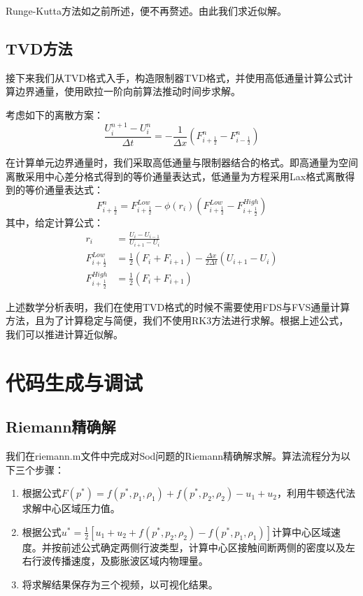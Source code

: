 \documentclass[12pt,a4paper]{article}%
\begin{document}
		Runge-Kutta方法如之前所述，便不再赘述。由此我们求近似解。
		
		\subsection{TVD方法}
		接下来我们从TVD格式入手，构造限制器TVD格式，并使用高低通量计算公式计算边界通量，使用欧拉一阶向前算法推动时间步求解。
		
		考虑如下的离散方案：
		\[
			\frac{U_i^{n+1} - U_i^n}{\Delta t} = -\frac{1}{\Delta x}(F^n_{i+\frac12} - F^n_{i-\frac12})
		\]
		
		在计算单元边界通量时，我们采取高低通量与限制器结合的格式。即高通量为空间离散采用中心差分格式得到的等价通量表达式，低通量为方程采用Lax格式离散得到的等价通量表达式：
		\[
			F^n_{i+\frac12} = F^{Low}_{i+\frac12} - \phi(r_i)(F^{Low}_{i+\frac12} - F^{High}_{i+\frac12})
		\]
		其中，给定计算公式：
		\[
			\begin{aligned}
				r_i &= \frac{U_i - U_{i-1}}{U_{i+1} - U_i} \\
				F^{Low}_{i+\frac12} &= \frac12(F_i + F_{i+1}) - \frac{\Delta x}{2\Delta t}(U_{i+1} - U_i) \\
				F^{High}_{i+\frac12} &= \frac12(F_i + F_{i+1})
			\end{aligned}
		\]
		
		上述数学分析表明，我们在使用TVD格式的时候不需要使用FDS与FVS通量计算方法，且为了计算稳定与简便，我们不使用RK3方法进行求解。根据上述公式，我们可以推进计算近似解。
		
		
	\section{代码生成与调试}
		\subsection{Riemann精确解}
		我们在riemann.m文件中完成对Sod问题的Riemann精确解求解。算法流程分为以下三个步骤：
		\begin{enumerate}
			\item 根据公式$F(p^*) = f(p^*,p_1,\rho_1) + f(p^*,p_2,\rho_2) - u_1 + u_2$，利用牛顿迭代法求解中心区域压力值。
			\item 根据公式$u^* = \frac{1}{2}[u_1 + u_2 + f(p^*,p_2,\rho_2) - f(p^*,p_1,\rho_1)]$计算中心区域速度。并按前述公式确定两侧行波类型，计算中心区接触间断两侧的密度以及左右行波传播速度，及膨胀波区域内物理量。
			\item 将求解结果保存为三个视频，以可视化结果。
		\end{enumerate}
		
\end{document}
